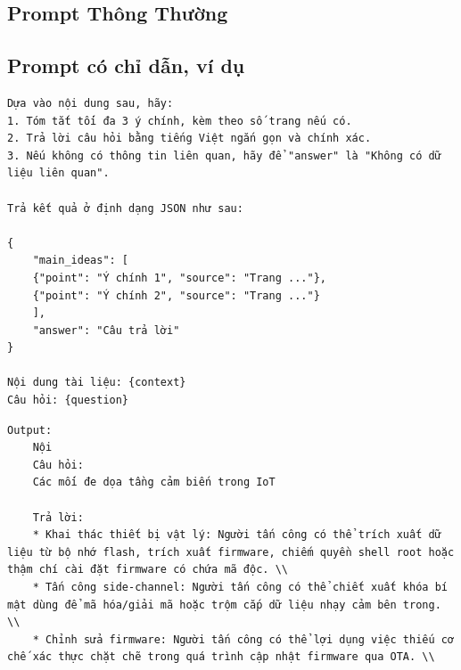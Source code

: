 \documentclass[11pt]{article}
\begin{document}
\subsection*{Prompt Thông Thường}



\subsection*{Prompt có chỉ dẫn, ví dụ}
\begin{verbatim}
Dựa vào nội dung sau, hãy:
1. Tóm tắt tối đa 3 ý chính, kèm theo số trang nếu có.
2. Trả lời câu hỏi bằng tiếng Việt ngắn gọn và chính xác.
3. Nếu không có thông tin liên quan, hãy để "answer" là "Không có dữ liệu liên quan".

Trả kết quả ở định dạng JSON như sau:

{
    "main_ideas": [
    {"point": "Ý chính 1", "source": "Trang ..."},
    {"point": "Ý chính 2", "source": "Trang ..."}
    ],
    "answer": "Câu trả lời"
}

Nội dung tài liệu: {context}
Câu hỏi: {question}
\end{verbatim}


\begin{verbatim}
Output:
	Nội
	Câu hỏi:
	Các mối đe dọa tầng cảm biến trong IoT

	Trả lời:
    * Khai thác thiết bị vật lý: Người tấn công có thể trích xuất dữ liệu từ bộ nhớ flash, trích xuất firmware, chiếm quyền shell root hoặc thậm chí cài đặt firmware có chứa mã độc. \\
    * Tấn công side-channel: Người tấn công có thể chiết xuất khóa bí mật dùng để mã hóa/giải mã hoặc trộm cắp dữ liệu nhạy cảm bên trong. \\
    * Chỉnh sửa firmware: Người tấn công có thể lợi dụng việc thiếu cơ chế xác thực chặt chẽ trong quá trình cập nhật firmware qua OTA. \\
\end{verbatim}
\end{document}
